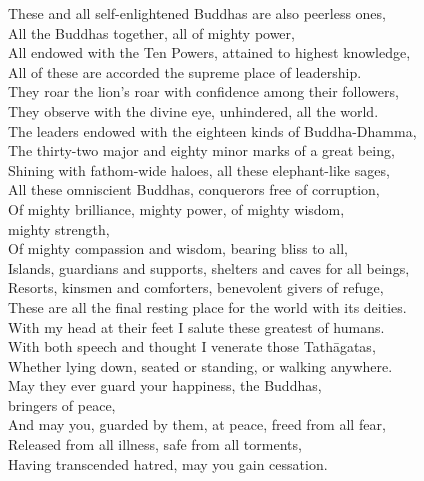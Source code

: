 These and all self-enlightened Buddhas are also peerless ones,\\
All the Buddhas together, all of mighty power,\\
All endowed with the Ten Powers, attained to highest knowledge,\\
All of these are accorded the supreme place of leadership.\\
They roar the lion's roar with confidence among their followers,\\
They observe with the divine eye, unhindered, all the world.\\
The leaders endowed with the eighteen kinds of Buddha-Dhamma,\\
The thirty-two major and eighty minor marks of a great being,\\
Shining with fathom-wide haloes, all these elephant-like sages,\\
All these omniscient Buddhas, conquerors free of corruption,\\
Of mighty brilliance, mighty power, of mighty wisdom,\\\vin mighty strength,\\
Of mighty compassion and wisdom, bearing bliss to all,\\
Islands, guardians and supports, shelters and caves for all beings,\\
Resorts, kinsmen and comforters, benevolent givers of refuge,\\
These are all the final resting place for the world with its deities.\\
With my head at their feet I salute these greatest of humans.\\
With both speech and thought I venerate those Tathāgatas,\\
Whether lying down, seated or standing, or walking anywhere.\\
May they ever guard your happiness, the Buddhas,\\\vin bringers of peace,\\
And may you, guarded by them, at peace, freed from all fear,\\
Released from all illness, safe from all torments,\\
Having transcended hatred, may you gain cessation.

